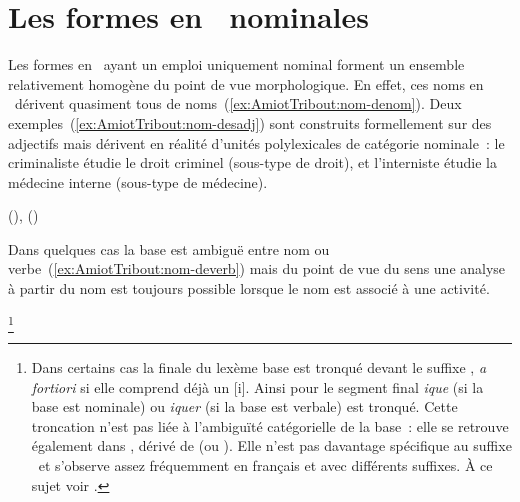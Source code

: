 \documentclass[output=paper]{LSP/langsci}
\begin{document}
\section{Les formes en \iste\ nominales} \label{section:AmiotTribout:iste-N-seuls}
Les formes en \iste\ ayant un emploi uniquement nominal forment un ensemble relativement homogène  du point de vue morphologique. En effet, ces noms en \iste\ dérivent quasiment tous de noms~(\ref{ex:AmiotTribout:nom-denom}). Deux exemples~(\ref{ex:AmiotTribout:nom-desadj}) sont construits formellement sur des adjectifs mais dérivent en réalité d'unités polylexicales de catégorie nominale~: le criminaliste étudie le droit criminel (sous-type de droit), et l'interniste étudie la médecine interne (sous-type de médecine).

\begin{exe}
\ex \label{ex:AmiotTribout:nom-denom}
\begin{xlist}
\ex {}
\ex \label{ex:AmiotTribout:nom-desadj}  (\orientg {}),  (\orientg {})
\end{xlist}
\end{exe}

Dans quelques cas la base est ambiguë entre nom ou verbe~(\ref{ex:AmiotTribout:nom-deverb}) mais du point de vue du sens une analyse à partir du nom est toujours possible lorsque le nom est associé à une activité.

\begin{exe}
\ex \label{ex:AmiotTribout:nom-deverb} \footnote{Dans certains cas la finale du lexème base est tronqué devant le suffixe  \iste, \textit{a fortiori} si elle comprend déjà un [i]. Ainsi pour  le segment final \textit{ique} (si la base est nominale) ou \textit{iquer} (si la base est verbale) est tronqué. Cette troncation n'est pas liée à l'ambiguïté catégorielle de la base~: elle se retrouve également dans , dérivé de  (ou ). Elle n'est pas davantage spécifique au suffixe \iste\ et s'observe assez fréquemment en français et avec différents suffixes. À ce sujet voir \citep{corbinplenat92}.}
\end{exe}
\end{document}
